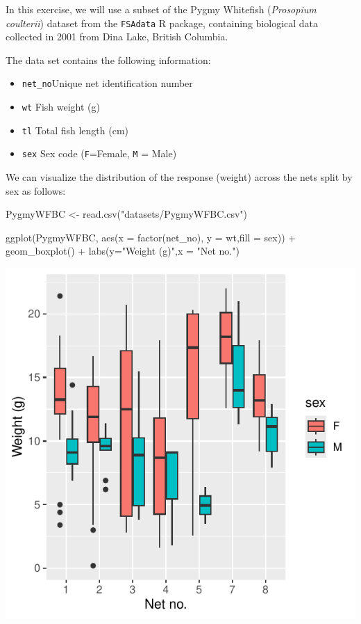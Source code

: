 \documentclass[
  letterpaper,
  DIV=11,
  numbers=noendperiod]{scrartcl}
\newenvironment{Shaded}{\begin{snugshade}}{\end{snugshade}}
\newcommand{\AttributeTok}[1]{\textcolor[rgb]{0.40,0.45,0.13}{#1}}
\newcommand{\FunctionTok}[1]{\textcolor[rgb]{0.28,0.35,0.67}{#1}}
\newcommand{\NormalTok}[1]{\textcolor[rgb]{0.00,0.23,0.31}{#1}}
\newcommand{\OtherTok}[1]{\textcolor[rgb]{0.00,0.23,0.31}{#1}}
\newcommand{\SpecialCharTok}[1]{\textcolor[rgb]{0.37,0.37,0.37}{#1}}
\newcommand{\StringTok}[1]{\textcolor[rgb]{0.13,0.47,0.30}{#1}}
\providecommand{\tightlist}{%
  \setlength{\itemsep}{0pt}\setlength{\parskip}{0pt}}\usepackage{longtable,booktabs,array}
\begin{document}
In this exercise, we will use a subset of the Pygmy Whitefish
(\emph{Prosopium coulterii}) dataset from the \texttt{FSAdata} R
package, containing biological data collected in 2001 from Dina Lake,
British Columbia.

The data set contains the following information:

\begin{itemize}
\tightlist
\item
  \texttt{net\_no}Unique net identification number
\item
  \texttt{wt} Fish weight (g)
\item
  \texttt{tl} Total fish length (cm)
\item
  \texttt{sex} Sex code (\texttt{F}=Female, \texttt{M} = Male)
\end{itemize}

We can visualize the distribution of the response (weight) across the
nets split by sex as follows:

\begin{Shaded}
\begin{Highlighting}[]
\NormalTok{PygmyWFBC }\OtherTok{\textless{}{-}} \FunctionTok{read.csv}\NormalTok{(}\StringTok{"datasets/PygmyWFBC.csv"}\NormalTok{)}

\FunctionTok{ggplot}\NormalTok{(PygmyWFBC, }\FunctionTok{aes}\NormalTok{(}\AttributeTok{x =} \FunctionTok{factor}\NormalTok{(net\_no), }\AttributeTok{y =}\NormalTok{ wt,}\AttributeTok{fill =}\NormalTok{ sex)) }\SpecialCharTok{+} 
  \FunctionTok{geom\_boxplot}\NormalTok{() }\SpecialCharTok{+} 
  \FunctionTok{labs}\NormalTok{(}\AttributeTok{y=}\StringTok{"Weight (g)"}\NormalTok{,}\AttributeTok{x =} \StringTok{"Net no."}\NormalTok{)}
\end{Highlighting}
\end{Shaded}

\begin{center}
\includegraphics{day1_practical_2_files/figure-pdf/unnamed-chunk-17-1.pdf}
\end{center}
\end{document}
